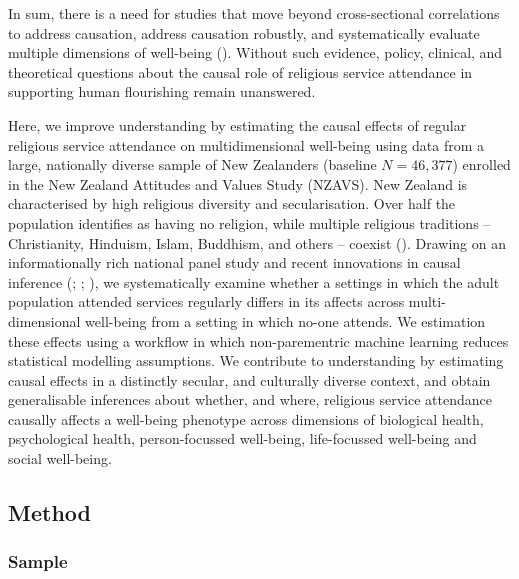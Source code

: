 \documentclass[
  single column]{article}
\begin{document}
In sum, there is a need for studies that move beyond cross-sectional
correlations to address causation, address causation robustly, and
systematically evaluate multiple dimensions of well-being
().
Without such evidence, policy, clinical, and theoretical questions about
the causal role of religious service attendance in supporting human
flourishing remain unanswered.

Here, we improve understanding by estimating the causal effects of
regular religious service attendance on multidimensional well-being
using data from a large, nationally diverse sample of New Zealanders
(baseline \(N=46,377\)) enrolled in the New Zealand Attitudes and Values
Study (NZAVS). New Zealand is characterised by high religious diversity
and secularisation. Over half the population identifies as having no
religion, while multiple religious traditions -- Christianity, Hinduism,
Islam, Buddhism, and others -- coexist
(). Drawing
on an informationally rich national panel study and recent innovations
in causal inference (;
;
), we systematically
examine whether a settings in which the adult population attended
services regularly differs in its affects across multi-dimensional
well-being from a setting in which no-one attends. We estimation these
effects using a workflow in which non-parementric machine learning
reduces statistical modelling assumptions. We contribute to
understanding by estimating causal effects in a distinctly secular, and
culturally diverse context, and obtain generalisable inferences about
whether, and where, religious service attendance causally affects a
well-being phenotype across dimensions of biological health,
psychological health, person-focussed well-being, life-focussed
well-being and social well-being.

\subsection{Method}\label{method}

\subsubsection{Sample}\label{sample}
\end{document}
